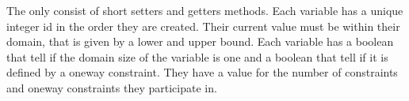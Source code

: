 The   only consist of short setters and getters methods. Each variable has a unique 
integer id in the order they are created. Their current value must be within their domain, that is given by a lower and 
upper bound. Each variable has a boolean that tell if the domain size of the variable is one and a boolean that tell 
if it is defined by a oneway constraint. They have a value for the number of constraints and oneway constraints they 
participate in. \\ 
